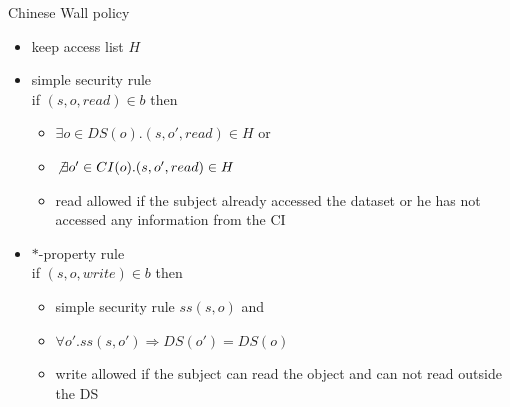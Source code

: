 \documentclass{beamer}
\begin{document}
\begin{frame}{Chinese Wall policy}
  \begin{itemize}
    \item keep access list $H$
    \item<2-> simple security rule\\
      if $(s, o, read) \in b$ then
      \begin{itemize}
        \item $\exists o \in DS(o). (s, o', read) \in H$ or
        \item $\not \exists o' \in CI(o). (s, o', read) \in H$
        \item read allowed if the subject already accessed the dataset
          or he has not accessed any information from the CI
      \end{itemize}
    \item<3-> $*$-property rule\\
      if $(s, o, write) \in b$ then
      \begin{itemize}
        \item simple security rule $ss(s,o)$ and
        \item $\forall o'.ss(s,o') \Rightarrow DS(o') = DS(o)$
        \item write allowed if the subject can read the object and can
          not read outside the DS
      \end{itemize}
  \end{itemize}
\end{frame}
\end{document}
